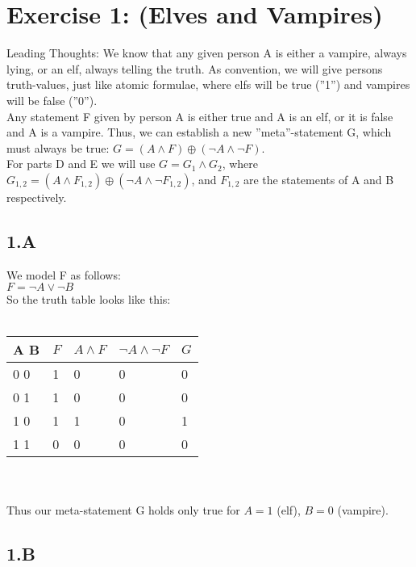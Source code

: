 \documentclass[12pt]{article}
\begin{document}
 

\rhead{\today}


\section*{Exercise 1: (Elves and Vampires)}

Leading Thoughts: We know that any given person A is either a vampire, always lying, or an elf, always telling the truth. As convention, we will give persons truth-values, just like atomic formulae, where elfs will be true (''1'') and vampires will be false (''0'').\\
Any statement F given by person A is either true and A is an elf, or it is false and A is a vampire. Thus, we can establish a new ''meta''-statement G, which must always be true: $G = (A \land F) \oplus ( \neg A \land \neg F )$.\\
For parts D and E we will use $G = G_1 \land G_2$, where $G_{1,2} = (A \land F_{1,2}) \oplus ( \neg A \land \neg F_{1,2} ) $, and $F_{1,2}$ are the statements of A and B respectively.

\subsection*{1.A}

We model F as follows:\\
$F = \neg A \lor \neg B$ \\
So the truth table looks like this:\\\\
\begin{tabular}{  l | l | l | l | l}
	A B & $F$ & $A \land F $ & $\neg A \land \neg F$ & $G$ \\ \hline
	0 0 & 1 & 0 & 0 & 0 \\
	0 1 & 1 & 0 & 0 & 0 \\
	1 0 & 1 & 1 & 0 & 1 \\
	1 1 & 0 & 0 & 0 & 0 \\
\end{tabular} \\\\
Thus our meta-statement G holds only true for $A=1$ (elf), $B=0$ (vampire).

\subsection*{1.B}
\end{document}

